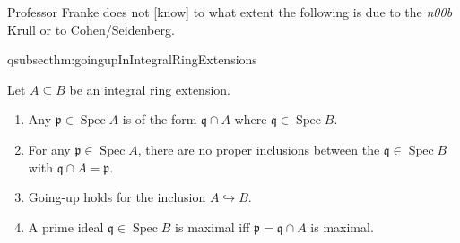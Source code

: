 \documentclass[DIV=14,parskip=full,pointednumbers]{scrartcl}
\newenvironment{alphanumerate}{\begin{enumerate}[label={$(\alph*)$},ref=\curthm]}{\end{enumerate}}
\theoremstyle{cthm}
\theoremstyle{cvarthm}
\theoremstyle{cdef}
\newcommand{\lbl}[1]{
	\label{#1}
	\ifmmode
	\expandafter\xdef\csname eqsubsec#1\endcsname{\thesubsection}
	\fi
}
\newcommand{\pp}{\mathfrak{p}}
\newcommand{\qq}{\mathfrak{q}}
\newcommand{\Spec}{\operatorname{Spec}}
\begin{document}
	Professor Franke does not [know] to what extent the following is due to the \emph{n00b} Krull or to Cohen/Seidenberg.
	\begin{thm}\lbl{thm:goingupInIntegralRingExtensions}
		Let $A\subseteq B$ be an integral ring extension.
		\begin{alphanumerate}
		\item 
			 Any $\pp\in\Spec A$ is of the form  $\qq\cap A$ where $\qq\in\Spec B$.
		\item 
			For any $\pp\in \Spec A$, there are no proper inclusions between the $\qq\in\Spec B$ with $\qq\cap A = \pp$.
		\item
			Going-up holds for the inclusion $A\hookrightarrow B$.
		\item
			A prime ideal $\qq\in\Spec B$ is maximal iff $\pp = \qq\cap A$ is maximal.
		\end{alphanumerate}
	\end{thm}
\end{document}
